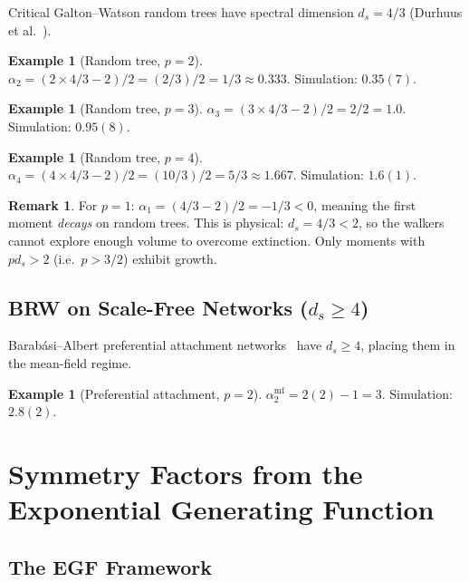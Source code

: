 \documentclass[11pt,a4paper]{article}
\theoremstyle{definition}
\newtheorem{example}[theorem]{Example}
\newtheorem*{remark}{Remark}
\begin{document}
Critical Galton--Watson random trees have spectral dimension
$d_s = 4/3$ (Durhuus et al.~\cite{durhuus2006}).

\begin{example}[Random tree, $p = 2$]
$\alpha_2 = (2 \times 4/3 - 2)/2 = (2/3)/2 = 1/3 \approx 0.333$.
Simulation: $0.35(7)$. \checkmark
\end{example}

\begin{example}[Random tree, $p = 3$]
$\alpha_3 = (3 \times 4/3 - 2)/2 = 2/2 = 1.0$.
Simulation: $0.95(8)$. \checkmark
\end{example}

\begin{example}[Random tree, $p = 4$]
$\alpha_4 = (4 \times 4/3 - 2)/2 = (10/3)/2 = 5/3 \approx 1.667$.
Simulation: $1.6(1)$. \checkmark
\end{example}

\begin{remark}
For $p = 1$: $\alpha_1 = (4/3 - 2)/2 = -1/3 < 0$, meaning the first
moment \emph{decays} on random trees. This is physical: $d_s = 4/3 < 2$,
so the walkers cannot explore enough volume to overcome extinction.
Only moments with $pd_s > 2$ (i.e.\ $p > 3/2$) exhibit growth.
\end{remark}

\subsection{BRW on Scale-Free Networks ($d_s \geq 4$)}
\label{sec:scalefree}

Barab\'{a}si--Albert preferential attachment networks~\cite{barabasi1999}
have $d_s \geq 4$, placing them in the mean-field regime.

\begin{example}[Preferential attachment, $p = 2$]
$\alpha_2^{\mathrm{mf}} = 2(2) - 1 = 3$.
Simulation: $2.8(2)$. \checkmark
\end{example}

\section{Symmetry Factors from the Exponential Generating Function}
\label{sec:symmetry}

\subsection{The EGF Framework}
\end{document}
